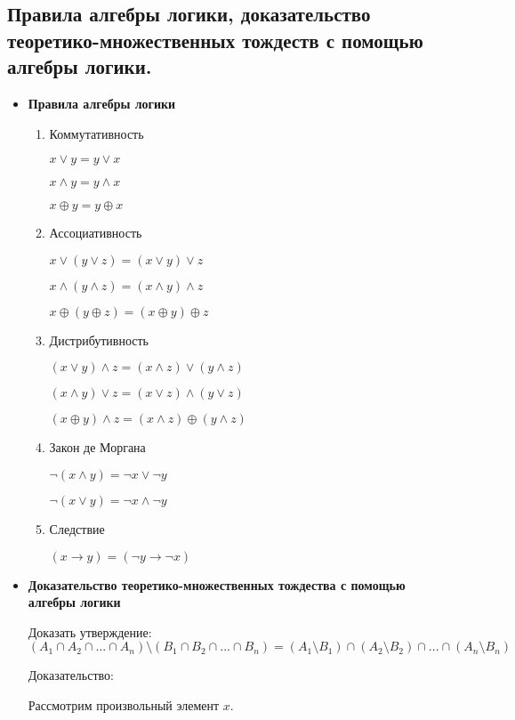 \subsection{Правила алгебры логики, доказательство теоретико-множественных тождеств с помощью алгебры логики.}

\begin{itemize}
	\item \textbf{Правила алгебры логики}
	\begin{enumerate}
		\item Коммутативность
		
		$x \vee y = y \vee x$
		
		$x \wedge y = y \wedge x$
		
		$x \oplus y = y \oplus x$

		\item Ассоциативность
		
		$x \vee (y \vee z)  = (x \vee y) \vee z$
		
		$x \wedge (y \wedge z)  = (x \wedge y) \wedge z$
		
		$x \oplus (y \oplus z)  = (x \oplus y) \oplus z$
		
		\item Дистрибутивность
		
		$(x \vee y) \wedge z = (x \wedge z) \vee (y \wedge z)$
		
		$(x \wedge y) \vee z = (x \vee z) \wedge (y \vee z)$
		
		$(x \oplus y) \wedge z = (x \wedge z) \oplus (y \wedge z)$
		
		\item Закон де Моргана
		
		$\neg(x \wedge y) = \neg x \vee \neg y$
		
		$\neg(x \vee y) = \neg x \wedge \neg y$
		
		\item Следствие
		
		$(x \to y) = (\neg y \to \neg x)$
	\end{enumerate}
	
	\item \textbf{Доказательство теоретико-множественных тождества с помощью алгебры логики}
	
	Доказать утверждение: $(A_1 \cap A_2 \cap ... \cap A_n) \setminus (B_1 \cap B_2 \cap ... \cap B_n) = (A_1 \setminus B_1) \cap (A_2 \setminus B_2) \cap ... \cap (A_n \setminus B_n)$
	
	Доказательство:
	
	Рассмотрим произвольный элемент $x$.
	

\end{itemize}
